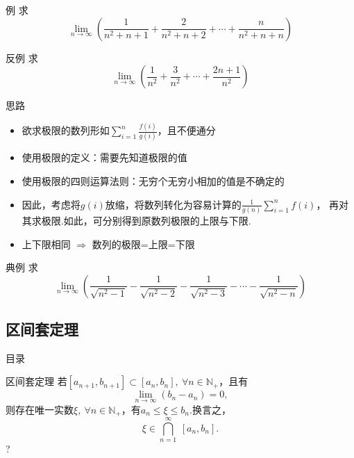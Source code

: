 \documentclass[]{beamer}
\begin{document}
\begin{frame}{例}
    求
    \[
    \lim_{n\rightarrow\infty}\left(\frac{1}{n^2+n+1}+\frac{2}{n^2+n+2}+\cdots+\frac{n}{n^2+n+n}\right)
    \]
\end{frame}

\begin{frame}{反例}
    求
    \[
    \lim_{n\rightarrow\infty}\left(\frac{1}{n^2}+\frac{3}{n^2}+\cdots+\frac{2n+1}{n^2}\right)
    \]
\end{frame}

\begin{frame}{思路}
    \begin{itemize}
        \item 欲求极限的数列形如$\sum\limits_{i=1}^n\frac{f(i)}{g(i)}$，且不便通分
        \item 使用极限的定义：需要先知道极限的值
        \item 使用极限的四则运算法则：无穷个无穷小相加的值是不确定的
        \item 因此，考虑将$g(i)$放缩，将数列转化为容易计算的$\frac{1}{g(n)}\sum\limits_{i=1}^nf(i)$，
              再对其求极限.如此，可分别得到原数列极限的上限与下限.
        \item 上下限相同 $\Rightarrow$ 数列的极限=上限=下限
    \end{itemize}
\end{frame}

\begin{frame}{典例}
    求
    \[
    \lim_{n\rightarrow\infty}\left(\frac{1}{\sqrt{n^2-1}}-\frac{1}{\sqrt{n^2-2}}-\frac{1}{\sqrt{n^2-3}}-\cdots-\frac{1}{\sqrt{n^2-n}}\right)
    \]
\end{frame}

\subsection{区间套定理}

\begin{frame}{目录}
    \tableofcontents[currentsection]
\end{frame}

\begin{frame}{区间套定理}
    若$[a_{n+1},b_{n+1}]\subset[a_n,b_n],\ \forall n\in\mathbb{N}_+$，且有
    \[
    \lim_{n\rightarrow\infty}(b_n-a_n)=0,
    \]
    则存在唯一实数$\xi,\ \forall n\in\mathbb{N}_+$，有$a_n\le\xi\le b_n.$换言之，
    \[
    \xi\in\bigcap_{n=1}^\infty\ [a_n,b_n].
    \]
    \color{red}?
\end{frame}
\end{document}
